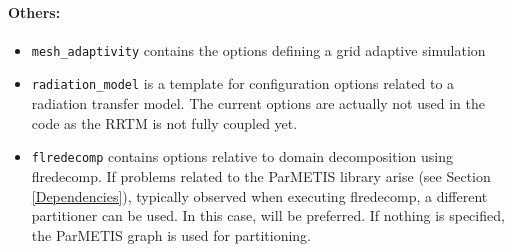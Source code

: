\documentclass[10pt,a4paper]{article}
\begin{document}
\paragraph{Others:}
\begin{itemize}
\item \texttt{mesh\_adaptivity} contains the options defining a grid adaptive simulation
\item \texttt{radiation\_model} is a template for configuration options related to a radiation transfer model. The current options are actually not used in the code as the RRTM is not fully coupled yet.
\item \texttt{flredecomp} contains options relative to domain decomposition using flredecomp. If problems related to the ParMETIS library arise (see Section \ref{Dependencies}), typically observed when executing flredecomp, a different partitioner can be used. In this case, \texttt{} will be preferred. If nothing is specified, the ParMETIS graph is used for partitioning.
\end{itemize}
\end{document}
